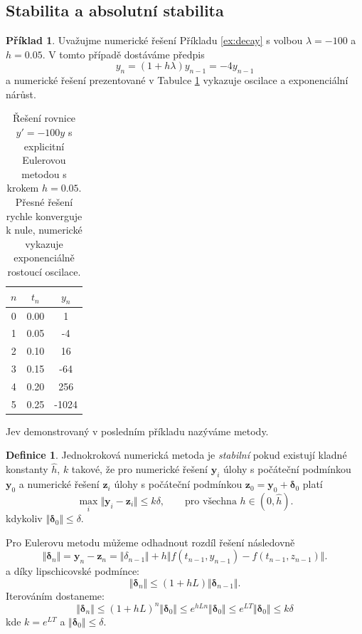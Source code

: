 \documentclass[a4paper, 12pt]{book}
\theoremstyle{definition}
\newtheorem{definition}[theorem]{Definice}
\newtheorem{example}[theorem]{Příklad}
\def\vc#1{\mathbf{\boldsymbol{#1}}}     %
\def\norm#1{\bigl\Vert#1\bigr\Vert} %
\def\df#1{\emph{#1}}
\begin{document}
\subsection{Stabilita a absolutní stabilita}
\begin{example}
Uvažujme numerické řešení Příkladu  \ref{ex:decay} s volbou $\lambda=-100$ a $h=0.05$. V tomto případě dostáváme předpis
\[
  y_n = (1 + h\lambda) y_{n-1} = -4 y_{n-1}
\]
a numerické řešení prezentované v Tabulce \ref{table:instability} vykazuje oscilace a exponenciální nárůst. 
\end{example}

\begin{table}
\centering
\begin{tabular}{|c|c|c|}
\hline
$n$ & $t_n$ & $y_n$\\ 
\hline
0 & 0.00 & 1\\ 
\hline
1 & 0.05 & -4\\ 
\hline
2 & 0.10 & 16\\ 
\hline
3 & 0.15 & -64\\ 
\hline
4 & 0.20 & 256\\ 
\hline
5 & 0.25 & -1024\\ 
\hline
\hline\end{tabular}
\label{table:instability}
\caption{Řešení rovnice $y'=-100y$ s explicitní Eulerovou metodou s krokem $h=0.05$. Přesné řešení rychle konverguje k nule, numerické vykazuje exponenciálně rostoucí oscilace.} 
\end{table}

Jev demonstrovaný v posledním příkladu nazýváme  metody.
\begin{definition}
 Jednokroková numerická metoda je \df{stabilní} pokud existují kladné konstanty $\hat h$, $k$ takové, že pro numerické řešení $\vc y_i$ úlohy s počáteční podmínkou $\vc y_0$ 
 a numerické řešení $\vc z_i$ úlohy s počáteční podmínkou $\vc z_0 = \vc y_0 + \vc \delta_0$ platí 
 \[
   \max_{i} \norm{\vc y_i - \vc z_i} \le k \delta,\qquad \text{pro všechna }h\in(0,\hat h).
 \]
 kdykoliv $\norm{\vc \delta_0} \le \delta$.
\end{definition}
Pro Eulerovu metodu můžeme odhadnout rozdíl řešení následovně
\[
  \norm{\vc\delta_n} = \vc y_n - \vc z_n = \norm{\delta_{n-1}} + h\norm{f(t_{n-1}, y_{n-1}) - f(t_{n-1}, z_{n-1}) }.
\]
a díky lipschicovské podmínce:
\[
  \norm{\vc\delta_n} \le (1 + hL)\norm{\vc\delta_{n-1}}.
\]
Iterováním dostaneme:
\[
  \norm{\vc\delta_n} \le (1+hL)^n\norm{\vc\delta_0} \le e^{hLn}\norm{\vc\delta_0} \le e^{LT}\norm{\vc\delta_0} \le k \delta
\]
kde $k = e^{LT}$ a $\norm{\vc\delta_0} \le \delta$.
\end{document}
